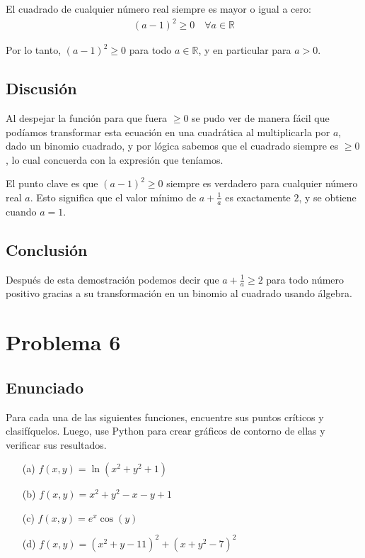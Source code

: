 \documentclass{article}
\begin{document}
El cuadrado de cualquier número real siempre es mayor o igual a cero:
\begin{align}
(a - 1)^2 \geq 0 \quad \forall a \in \mathbb{R}
\end{align}

Por lo tanto, $(a - 1)^2 \geq 0$ para todo $a \in \mathbb{R}$, y en particular para $a > 0$.


\subsection{Discusión}

Al despejar la función para que fuera $\geq 0$ se pudo ver de manera fácil que podíamos transformar esta ecuación en una cuadrática al multiplicarla por $a$, dado un binomio cuadrado, y por lógica sabemos que el cuadrado siempre es $\geq 0$, lo cual concuerda con la expresión que teníamos.

El punto clave es que $(a-1)^2 \geq 0$ siempre es verdadero para cualquier número real $a$. Esto significa que el valor mínimo de $a + \frac{1}{a}$ es exactamente $2$, y se obtiene cuando $a = 1$.


\subsection{Conclusión}

Después de esta demostración podemos decir que $a + \frac{1}{a} \geq 2$ para todo número positivo gracias a su transformación en un binomio al cuadrado usando álgebra.

\section{Problema 6}

\subsection{Enunciado}
Para cada una de las siguientes funciones, encuentre sus puntos críticos y clasifíquelos. Luego, use Python para crear gráficos de contorno de ellas y verificar sus resultados.

\begin{enumerate}
  \item[(a)] $f(x,y) = \ln(x^{2} + y^{2} + 1)$
  \item[(b)] $f(x,y) = x^{2} + y^{2} - x - y + 1$
  \item[(c)] $f(x,y) = e^{x}\cos(y)$
  \item[(d)] $f(x,y) = (x^{2} + y - 11)^{2} + (x + y^{2} - 7)^{2}$
\end{enumerate}
\end{document}
